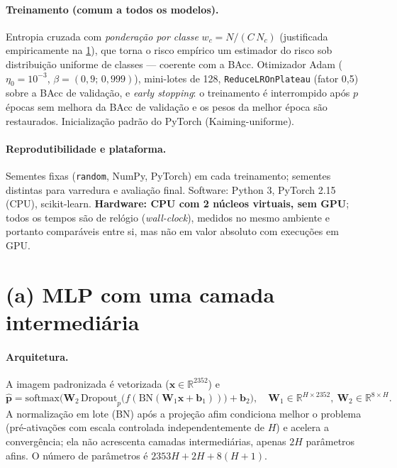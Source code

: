 \documentclass[10pt,a4paper]{article}
\begin{document}
\paragraph{Treinamento (comum a todos os modelos).} Entropia cruzada com \emph{ponderação por classe}
$w_c=N/(C\,N_c)$ (justificada empiricamente na \cref{sec:mlp}), que torna o risco empírico um estimador do
risco sob distribuição uniforme de classes --- coerente com a BAcc. Otimizador Adam
($\eta_0=10^{-3}$, $\beta=(0{,}9;\,0{,}999)$), mini-lotes de 128, \texttt{ReduceLROnPlateau} (fator 0,5)
sobre a BAcc de validação, e \emph{early stopping}: o treinamento é interrompido após $p$ épocas sem melhora
da BAcc de validação e os pesos da melhor época são restaurados. Inicialização padrão do PyTorch
(Kaiming-uniforme).

\paragraph{Reprodutibilidade e plataforma.} Sementes fixas (\texttt{random}, NumPy, PyTorch) em cada
treinamento; sementes distintas para varredura e avaliação final. Software: Python 3, PyTorch 2.15 (CPU),
scikit-learn. \textbf{Hardware: CPU com 2 núcleos virtuais, sem GPU}; todos os tempos são de relógio
(\emph{wall-clock}), medidos no mesmo ambiente e portanto comparáveis entre si, mas não em valor absoluto com
execuções em GPU.

\section{(a) MLP com uma camada intermediária}\label{sec:mlp}
\paragraph{Arquitetura.} A imagem padronizada é vetorizada ($\mathbf x\in\mathbb R^{2352}$) e
\begin{equation}
\hat{\mathbf p}=\mathrm{softmax}\!\big(\mathbf W_2\,\mathrm{Dropout}_p\big(f(\mathrm{BN}(\mathbf W_1\mathbf x+\mathbf b_1))\big)+\mathbf b_2\big),
\quad \mathbf W_1\in\mathbb R^{H\times2352},\ \mathbf W_2\in\mathbb R^{8\times H}.
\end{equation}
A normalização em lote (BN) após a projeção afim condiciona melhor o problema (pré-ativações com escala
controlada independentemente de $H$) e acelera a convergência; ela não acrescenta camadas intermediárias,
apenas $2H$ parâmetros afins. O número de parâmetros é $2353H+2H+8(H+1)$.
\end{document}
